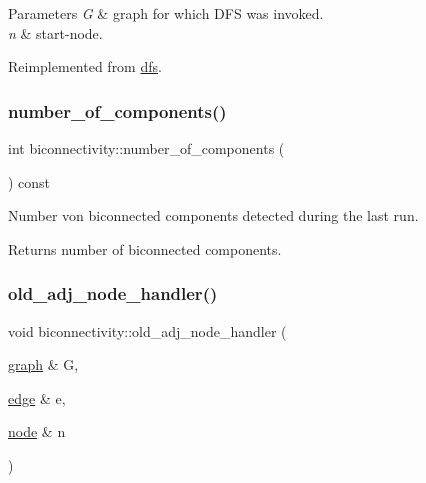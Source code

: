 \begin{DoxyParams}{Parameters}
{\em G} & graph for which D\+FS was invoked. \\
\hline
{\em n} & start-\/node. \\
\hline
\end{DoxyParams}


Reimplemented from \mbox{\hyperlink{classdfs_a3b5fbea7a7baed9946cfb4444a7f20ea}{dfs}}.

\mbox{\label{classbiconnectivity_ad77634a59ac6a08fae43c1c38540d5f0}} 
\subsubsection{\texorpdfstring{number\+\_\+of\+\_\+components()}{number\_of\_components()}}
{\footnotesize\ttfamily int biconnectivity\+::number\+\_\+of\+\_\+components (\begin{DoxyParamCaption}{ }\end{DoxyParamCaption}) const\hspace{0.3cm}{\ttfamily [inline]}}



Number von biconnected components detected during the last run. 

\begin{DoxyReturn}{Returns}
number of biconnected components. 
\end{DoxyReturn}
\mbox{\label{classbiconnectivity_a92228b87472140374dffea7d9f7ee20d}} 
\subsubsection{\texorpdfstring{old\+\_\+adj\+\_\+node\+\_\+handler()}{old\_adj\_node\_handler()}}
{\footnotesize\ttfamily void biconnectivity\+::old\+\_\+adj\+\_\+node\+\_\+handler (\begin{DoxyParamCaption}\item[{\mbox{\hyperlink{classgraph}{graph}} \&}]{G,  }\item[{\mbox{\hyperlink{classedge}{edge}} \&}]{e,  }\item[{\mbox{\hyperlink{classnode}{node}} \&}]{n }\end{DoxyParamCaption})\hspace{0.3cm}{\ttfamily [virtual]}}



